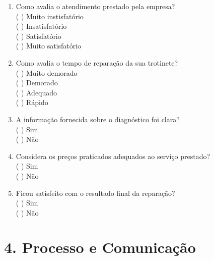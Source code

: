 \documentclass[11pt,a4paper]{article}
\begin{document}
\begin{enumerate}[leftmargin=*, resume]

\item Como avalia o atendimento prestado pela empresa? \\
( ) Muito instisfatório \\
( ) Insatisfatório \\
( ) Satisfatório \\
( ) Muito satisfatório \\

\item Como avalia o tempo de reparação da sua trotinete? \\
( ) Muito demorado \\
( ) Demorado \\
( ) Adequado \\
( ) Rápido \\

\item A informação fornecida sobre o diagnóstico foi clara? \\
( ) Sim \\
( ) Não \\

\item Considera os preços praticados adequados ao serviço prestado? \\
( ) Sim \\
( ) Não \\

\item Ficou satisfeito com o resultado final da reparação? \\
( ) Sim \\
( ) Não \\

\end{enumerate}

\vspace{0.5cm}

\section*{4. Processo e Comunicação}
\end{document}
